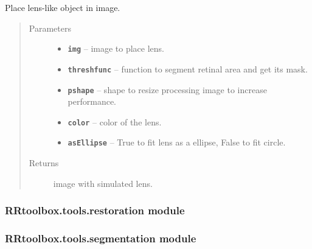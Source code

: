 \documentclass[letterpaper,10pt,english]{sphinxmanual}
\begin{document}

\begin{fulllineitems}
\label{RRtoolbox.tools:RRtoolbox.tools.lens.simulateLens}
Place lens-like object in image.
\begin{quote}\begin{description}
\item[{Parameters}] \leavevmode\begin{itemize}
\item {} 
\textbf{\texttt{img}} -- image to place lens.

\item {} 
\textbf{\texttt{threshfunc}} -- function to segment retinal area and get its mask.

\item {} 
\textbf{\texttt{pshape}} -- shape to resize processing image to increase performance.

\item {} 
\textbf{\texttt{color}} -- color of the lens.

\item {} 
\textbf{\texttt{asEllipse}} -- True to fit lens as a ellipse, False to fit circle.

\end{itemize}

\item[{Returns}] \leavevmode
image with simulated lens.

\end{description}\end{quote}

\end{fulllineitems}



\subsubsection{RRtoolbox.tools.restoration module}
\label{RRtoolbox.tools:rrtoolbox-tools-restoration-module}

\subsubsection{RRtoolbox.tools.segmentation module}
\label{RRtoolbox.tools:rrtoolbox-tools-segmentation-module}\label{RRtoolbox.tools:module-RRtoolbox.tools.segmentation}
\end{document}
